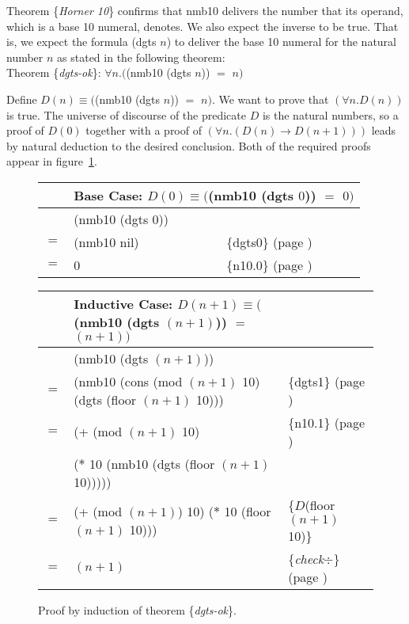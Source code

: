 Theorem \{\emph{Horner 10}\} confirms that \textsf{nmb10} delivers the
number that its operand, which is a base 10 numeral, denotes.
We also expect the inverse to be true.
That is, we expect the formula \textsf{(dgts $n$)}
to deliver the base 10 numeral for the natural number $n$
as stated in the following theorem:
\label{dgts-ok}
\vspace{2mm}\\
\hspace*{5mm}Theorem \{\emph{dgts-ok}\}:
$\forall n.($\textsf{(nmb10 (dgts $n$))} $=$ $n)$
\vspace{1cm}

Define $D(n) \equiv ($\textsf{(nmb10 (dgts $n$))} $=$ $n)$.
We want to prove that $(\forall n.D(n))$ is true.
The universe of discourse
of the predicate $D$ is the natural numbers,
so a proof of $D(0)$
together with a proof of
$(\forall n.(D(n) \rightarrow D(n+1)))$
leads by natural deduction to the desired conclusion.
Both of the required proofs appear in
figure~\ref{fig:horner10-inverse}.

\begin{figure}
\begin{center}
\begin{tabular}{rll}
&\multicolumn{2}{l}{Base Case: $D(0) \equiv ($\textsf{(nmb10 (dgts $0$))} $=$ $0)$}\\
    \hline
    & \textsf{(nmb10 (dgts $0$))} & \\
$=$ & \textsf{(nmb10 nil)}        & \{dgts0\} (page \pageref{dgts-defun}) \\
$=$ & \textsf{0}                  & \{n10.0\} (page \pageref{nmb10-defun}) \\
\end{tabular}
\end{center}
\begin{center}
\addtolength{\tabcolsep}{-2pt}
\begin{tabular}{rll}
&Inductive Case: $D(n+1) \equiv ($\textsf{(nmb10 (dgts $(n+1)$))} $=$ $(n + 1))$&\\
    \hline
    & \textsf{(nmb10 (dgts $(n+1)$))}           & \\
$=$ & \textsf{(nmb10 (cons (mod $(n+1)$ 10) (dgts (floor $(n+1)$ 10)))}  & \{dgts1\} (page \pageref{dgts-defun})\\
$=$ & \textsf{(+ (mod $(n+1)$ 10)}              & \{n10.1\} (page \pageref{nmb10-defun})\\
    & \phantom{\textsf{(+ }}\textsf{($*$ 10 (nmb10 (dgts (floor $(n+1)$ 10)))))} &\\
$=$ & \textsf{(+ (mod $(n+1)$) 10) ($*$ 10 (floor $(n+1)$ 10)))}  & \{$D$(floor $(n+1)$ 10)\} \\
$=$ & $(n+1)$  & \{\emph{check}$\div$\} (page \pageref{third-grade-division})
\end{tabular}
\addtolength{\tabcolsep}{2pt}
\end{center}
\caption{Proof by induction of theorem \{\emph{dgts-ok}\}.}
\label{fig:horner10-inverse}
\end{figure}


